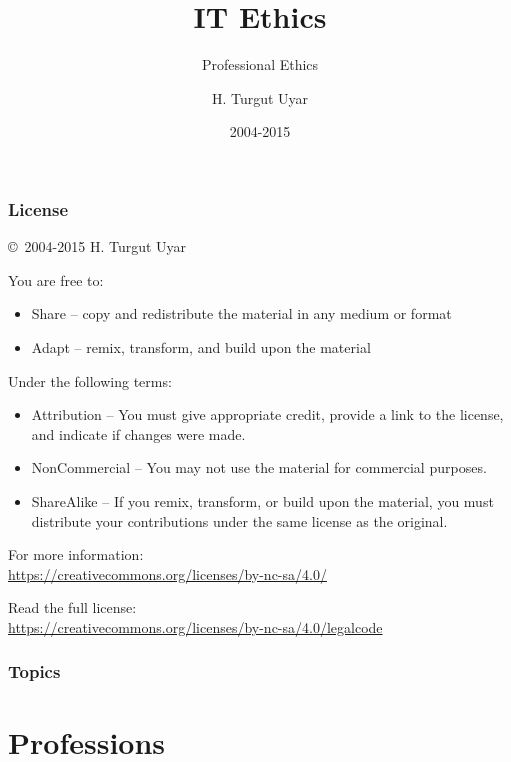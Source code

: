 \documentclass[dvipsnames]{beamer}
\title{IT Ethics}
\subtitle{Professional Ethics}
\author{H. Turgut Uyar}
\date{2004-2015}
\theoremstyle{plain}
\begin{document}
\begin{frame}
  \titlepage
\end{frame}

\begin{frame}
  \frametitle{License}

  \hfill
  \copyright~2004-2015 H. Turgut Uyar

  \vfill
  \begin{footnotesize}
    You are free to:
    \begin{itemize}
      \itemsep0em
      \item Share -- copy and redistribute the material in any medium or format
      \item Adapt -- remix, transform, and build upon the material
    \end{itemize}

    Under the following terms:
    \begin{itemize}
      \itemsep0em
      \item Attribution -- You must give appropriate credit, provide a link to
        the license, and indicate if changes were made.

      \item NonCommercial -- You may not use the material for commercial
        purposes.

      \item ShareAlike -- If you remix, transform, or build upon the material,
        you must distribute your contributions under the same license as the
        original.
    \end{itemize}
  \end{footnotesize}

  \begin{small}
    For more information:\\
    \url{https://creativecommons.org/licenses/by-nc-sa/4.0/}

    \smallskip
    Read the full license:\\
    \url{https://creativecommons.org/licenses/by-nc-sa/4.0/legalcode}
  \end{small}
\end{frame}

\begin{frame}
  \frametitle{Topics}
  \tableofcontents
\end{frame}

\section{Professions}
\end{document}
